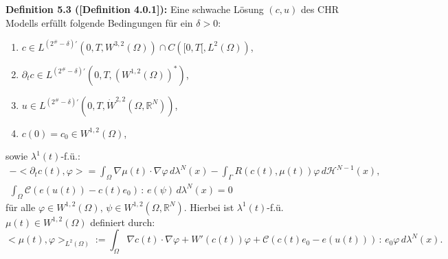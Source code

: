 \colorbox{generalYellow}{\begin{minipage}{16cm}{\textcolor{black}{}{\label{def5.3}}}
\textbf{Definition 5.3 (\cite{stinson2021analysis}[Definition 4.0.1]):} Eine schwache Lösung \((c,u)\) des CHR Modells erfüllt folgende Bedingungen für ein \(\delta > 0\):
\begin{enumerate}
    \item \(c \in L^{(2^\# - \delta)'}(0,T,W^{3,2}(\Omega)) \cap C([0,T[,L^2(\Omega))\),
    \item \(\partial_t c \in L^{(2^\# - \delta)'}(0,T,(W^{1,2}(\Omega))^*)\),
    \item \(u \in L^{(2^\# - \delta)'}(0,T,\dot{W}^{2,2}(\Omega,\mathbb{R}^N))\),
    \item \(c(0) = c_0 \in W^{1,2}(\Omega)\),
\end{enumerate}
sowie \(\lambda^1(t)\)-f.ü.:
\begin{equation}
\begin{array}{l}
     -<\partial_t c(t),\varphi> = \int_{\Omega} \nabla \mu(t) \cdot \nabla \varphi \,d\lambda^N(x) - \int_{\Gamma} R(c(t),\mu(t))\varphi \,d\mathcal{H}^{N-1}(x),\\
     \int_{\Omega} \mathcal{C}(e(u(t)) - c(t)e_0) \, : \, e(\psi) \,d\lambda^N(x) = 0
\end{array}
\end{equation}
für alle \(\varphi \in W^{1,2}(\Omega), \, \psi \in W^{1,2}(\Omega,\mathbb{R}^N)\). Hierbei ist \(\lambda^1(t)\)-f.ü. \(\mu(t) \in W^{1,2}(\Omega)\) definiert durch:
\begin{equation}
    <\mu(t),\varphi>_{L^2(\Omega)} := \int_{\Omega} \nabla c(t) \cdot \nabla \varphi + W'(c(t))\varphi + \mathcal{C}(c(t)e_0 - e(u(t))) \, : \, e_0 \varphi \,d\lambda^N(x).
\end{equation}
\end{minipage}}

